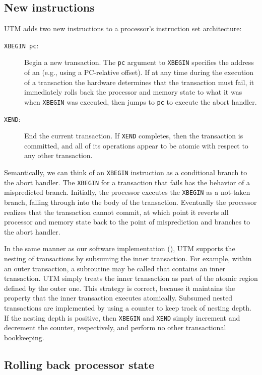 \subsection{New instructions}

UTM adds two new instructions to a processor's instruction set
architecture:
\begin{description}
\item[\texttt{XBEGIN pc}:] Begin a new transaction.  The
\texttt{pc} argument to \texttt{XBEGIN} specifies
the address of an  (e.g., using a PC-relative offset).
If at any time during the execution of a transaction the hardware determines
that the transaction must fail, it immediately rolls back the
processor and memory state to what it was when \texttt{XBEGIN} was
executed, then jumps to \texttt{pc} to execute the abort handler.
 
\item[\texttt{XEND}:] End the current transaction.  If \texttt{XEND}
completes, then the transaction is committed, and all of its
operations appear to be atomic with respect to any other transaction.
\end{description}

Semantically, we can think of an \texttt{XBEGIN} instruction as a
conditional branch to the abort handler.  The \texttt{XBEGIN} for a
transaction that fails has the behavior of a mispredicted branch.
Initially, the processor executes the \texttt{XBEGIN} as a not-taken
branch, falling through into the body of the transaction.  Eventually
the processor realizes that the transaction cannot commit, at which
point it reverts all processor and memory state back to the point of
misprediction and branches to the abort handler.

In the same manner as our software implementation (),
UTM supports the nesting of transactions by subsuming the inner
transaction.  For example, within an outer transaction, a
subroutine may be called that contains an inner transaction.
UTM simply treats the inner transaction as part of the atomic
region defined by the outer one.  This strategy is correct, because it
maintains the property that the inner transaction executes atomically.
Subsumed nested transactions are implemented by using a counter to
keep track of nesting depth.  If the nesting depth is positive, then
\texttt{XBEGIN} and \texttt{XEND} simply increment and decrement the
counter, respectively, and perform no other transactional bookkeeping.

\subsection{Rolling back processor state}

